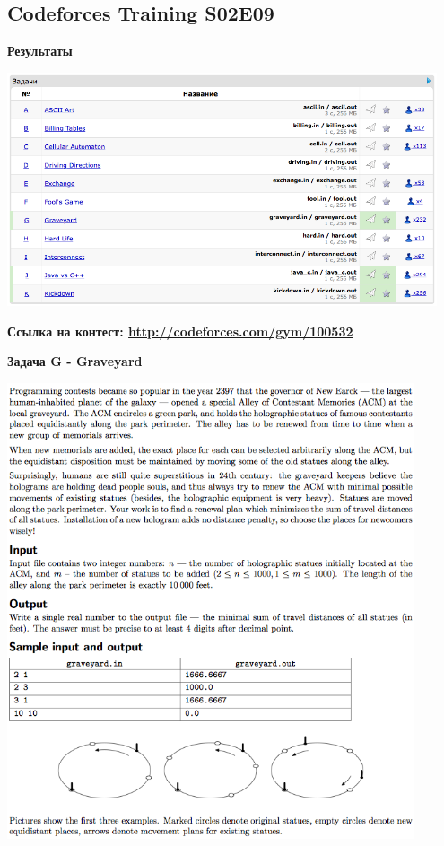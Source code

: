 \documentclass[a4paper,12pt]{article}
\begin{document}
%
%
\newpage
\subsection{Codeforces Training S02E09}

\textbf{{\large Результаты}} \\
\begin{center}
\includegraphics[width=0.95\textwidth]{CT_S02E09/CT_S02E09_result.png}\\ [1cm]
\end{center}

\textbf{{\large Ссылка на контест: \url{http://codeforces.com/gym/100532}}}

\newpage
\textbf{{\large Задача G - Graveyard}}

\begin{center}
\includegraphics[width=0.9\textwidth]{CT_S02E09/CT_S02E09_G.png}\\ [1cm]
\end{center}
\end{document}
